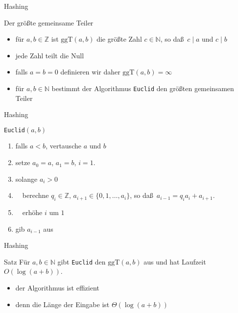 \documentclass[aspectratio=1610, 11pt]{beamer}
\newcommand\NN{\mathbb N}
\newcommand\ZZ{\mathbb Z}
\newcommand{\ggt}{\mathrm{ggT}}
\begin{document}
\begin{frame}{Hashing}
	\begin{exampleblock}{Der gr\"o\ss te gemeinsame Teiler}
		\begin{itemize}
			\item f\"ur $a,b\in\ZZ$ ist $\ggt(a,b)$ die gr\"o\ss te Zahl $c\in\NN$, so da\ss\ $c\mid a$ und $c\mid b$
			\item jede Zahl teilt die Null
			\item falls $a=b=0$ definieren wir daher $\ggt(a,b)=\infty$
			\item f\"ur $a,b\in\NN$ bestimmt der Algorithmus {\tt Euclid} den gr\"o\ss ten gemeinsamen Teiler
		\end{itemize}
	\end{exampleblock}
\end{frame}

\begin{frame}{Hashing}
	\begin{exampleblock}{{\tt Euclid}$(a,b)$}
		\begin{enumerate}
			\item falls $a<b$, vertausche $a$ und $b$
			\item setze $a_0=a$, $a_1=b$, $i=1$.
			\item solange $a_i>0$
			\item $\quad$berechne $q_i\in\ZZ$, $a_{i+1}\in\{0,1,\ldots,a_i\}$, so da\ss\ $a_{i-1}=q_ia_i+a_{i+1}$.
			\item $\quad$erh\"ohe $i$ um $1$
			\item gib $a_{i-1}$ aus
		\end{enumerate}
	\end{exampleblock}
\end{frame}

\begin{frame}{Hashing}
	\begin{block}{Satz}
		F\"ur $a,b\in\NN$ gibt {\tt Euclid} den $\ggt(a,b)$ aus und hat Laufzeit $O(\log(a+b))$.
	\end{block}
	\begin{exampleblock}{}
		\begin{itemize}
			\item der Algorithmus ist \alert{effizient}
			\item denn die L\"ange der Eingabe ist $\Theta(\log(a+b))$
		\end{itemize}
	\end{exampleblock}
\end{frame}
\end{document}
